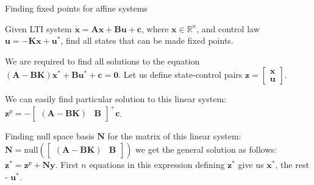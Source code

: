 \documentclass{beamer}
\begin{document}
\begin{frame}{Finding fixed points for affine systems}
\begin{flushleft}

Given LTI system $\dot{\mathbf{x}} = \mathbf{A} \mathbf{x} + \mathbf{B} \mathbf{u} + \mathbf{c}$, where $\mathbf{x} \in \mathbb{R}^n$, and control law $\mathbf{u} = -\mathbf{K}\mathbf{x} + \mathbf{u}^*$, find all states that can be made fixed points.

\bigskip

We are required to find all solutions to the equation $(\mathbf{A} - \mathbf{B}\mathbf{K})\mathbf{x}^* + \mathbf{B}\mathbf{u}^* + \mathbf{c} = \mathbf{0}$. Let us define state-control pairs $\mathbf{z} = \begin{bmatrix} \mathbf{x} \\ \mathbf{u} \end{bmatrix}$. 

\bigskip

We can easily find particular solution to this linear system: $\mathbf{z}^p = -\begin{bmatrix} (\mathbf{A} - \mathbf{B}\mathbf{K}) & \mathbf{B} \end{bmatrix}^+\mathbf{c}$. 

\bigskip

Finding null space basis $\mathbf{N}$ for the matrix of this linear system: $\mathbf{N} = \text{null}(\begin{bmatrix} (\mathbf{A} - \mathbf{B}\mathbf{K}) & \mathbf{B} \end{bmatrix})$ we get the general solution as follows: $\mathbf{z}^* = \mathbf{z}^p + \mathbf{N}\mathbf{y}$. First $n$ equations in this expression defining $\mathbf{z}^*$ give us $\mathbf{x}^*$, the rest - $\mathbf{u}^*$.

\end{flushleft}
\end{frame}
\end{document}
